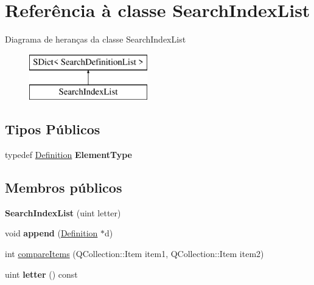 \hypertarget{class_search_index_list}{\section{Referência à classe Search\-Index\-List}
\label{class_search_index_list}
}
Diagrama de heranças da classe Search\-Index\-List\begin{figure}[H]
\begin{center}
\leavevmode
\includegraphics[height=2.000000cm]{class_search_index_list}
\end{center}
\end{figure}
\subsection*{Tipos Públicos}
\begin{DoxyCompactItemize}
\item 
\hypertarget{class_search_index_list_a0d23a1cf2cf442db7a5865af33254036}{typedef \hyperlink{class_definition}{Definition} {\bfseries Element\-Type}}\label{class_search_index_list_a0d23a1cf2cf442db7a5865af33254036}

\end{DoxyCompactItemize}
\subsection*{Membros públicos}
\begin{DoxyCompactItemize}
\item 
\hypertarget{class_search_index_list_a932c3079d0c52d140c83915dffe1ea6d}{{\bfseries Search\-Index\-List} (uint letter)}\label{class_search_index_list_a932c3079d0c52d140c83915dffe1ea6d}

\item 
\hypertarget{class_search_index_list_af2aa1d23349c80ac5004ce7743cfb58d}{void {\bfseries append} (\hyperlink{class_definition}{Definition} $\ast$d)}\label{class_search_index_list_af2aa1d23349c80ac5004ce7743cfb58d}

\item 
int \hyperlink{class_search_index_list_a219450accf048597ffc7113ecde4c402}{compare\-Items} (Q\-Collection\-::\-Item item1, Q\-Collection\-::\-Item item2)
\item 
\hypertarget{class_search_index_list_ada472040436550156c7064317abe8caa}{uint {\bfseries letter} () const }\label{class_search_index_list_ada472040436550156c7064317abe8caa}

\end{DoxyCompactItemize}


